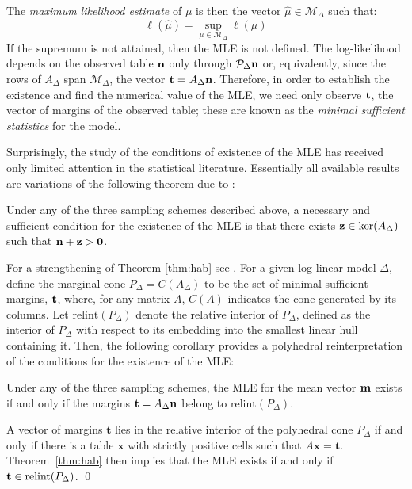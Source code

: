 \documentclass{elsart}
\newcommand{\ttt}{\mathbf{t}}
\begin{document}
The {\it maximum likelihood estimate} of $\mu$ is then the vector
$\hat{\mu} \in \mathcal{M}_\Delta$ such that:
\[
\ell({\hat{\mu}}) =\sup_{\mu \in \mathcal{M}_{\Delta}} \ell(\mu)
\]
If the supremum is not attained, then the MLE is not defined.
 The log-likelihood depends on the observed table ${\bf n}$ only through
$\mathcal{P}_{\Delta} {\bf n}$ or, equivalently, since the rows of
$A_{\Delta}$ span $\mathcal{M}_{\Delta}$, the vector ${\bf t} =
A_{\Delta}{\bf n}$. Therefore, in order to establish the existence and
find the numerical value of the MLE, we need only  observe ${\bf
t}$, the vector of margins of the observed table; these are known as 
the {\it minimal sufficient statistics} for the model.

Surprisingly, the study of the conditions of existence of the MLE
has received only limited attention in the statistical literature.
Essentially all 
 available results are variations of the following theorem due to
 \citet{HAB74}: 
\begin{thm}\label{thm:hab}
 Under any of the three sampling schemes described above, a necessary and
 sufficient condition for the existence of the MLE is that there
 exists ${\bf z} \in \ker(A_\Delta)$ such that ${\bf n}+ {\bf z} >
 {\bf 0}$. 
\end{thm}

For a strengthening  of Theorem \ref{thm:hab} see \citet{GMS02}.
For a given log-linear model $\Delta$, define the marginal cone
$P_\Delta=C(A_{\Delta})$ to be the set of minimal sufficient margins, ${\bf t}$,
where, for any matrix $A$, $C(A)$ indicates the cone generated by its
columns. Let $\mathrm{relint} (P_\Delta)$ denote the relative interior
of $P_\Delta$, defined as the interior of $P_\Delta$ with respect to
its embedding into the smallest linear hull containing it. Then, the
following corollary provides a polyhedral reinterpretation of the
conditions for the existence of the MLE:
\begin{cor}\label{thm:mle}
Under any of the three sampling schemes, the MLE for the
mean vector ${\bf m}$ exists if and only if the margins ${\bf t} =
A_{\Delta} {\bf n}$ belong to $\mathrm{relint} \left( P_{\Delta}
\right)$.
\end{cor}
\begin{pf}
A vector of margins $\mathbf{t}$ lies in the relative interior of the
polyhedral 
cone $P_\Delta$ if and only if there is a table $\mathbf{x}$ with
strictly positive cells such 
that $A\mathbf{x} = \ttt$.  Theorem~\ref{thm:hab} then implies that
the MLE exists if and only if $\ttt \in {\rm relint}(P_\Delta)$. 
\qed
\end{pf}
\end{document}
